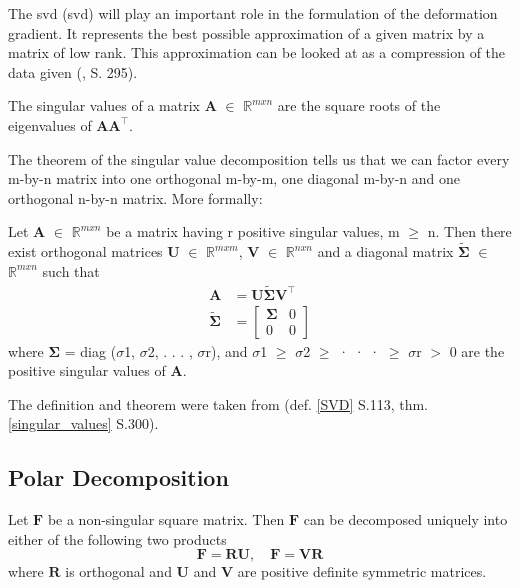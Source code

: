 The \acrlong{svd} (\acrshort{svd}) will play an important role in the formulation of the deformation gradient. It represents the best possible approximation of a given matrix by a matrix of low rank. This approximation can be looked at as a compression of the data given (\cite{LiesenMehrmann2015}, S. 295).

\begin{definition}
\label{singular_values}
The singular values of a matrix $\mathbf{A}$ $\in$ $\mathbb{R}^{m x n}$ are the square roots of the eigenvalues of $\mathbf{AA}^{\intercal}$.
\end{definition}

The theorem of the singular value decomposition tells us that we can factor every m-by-n matrix into one orthogonal m-by-m, one diagonal m-by-n and one orthogonal n-by-n matrix. More formally:

\begin{theorem}
\label{SVD}
Let $\mathbf{A}$ $\in$ $\mathbb{R}^{m x n}$ be a matrix having r positive singular values, m $\geq$ n. Then there exist orthogonal matrices $\mathbf{U}$ $\in$ $\mathbb{R}^{m x m}$, $\mathbf{V}$ $\in$ $\mathbb{R}^{n x n}$ and a diagonal matrix $\mathbf{\tilde{\Sigma}}$ $\in$ $\mathbb{R}^{m x n}$ such that
\begin{align*}
\mathbf{A} &= \mathbf{U \tilde{\Sigma} V^\intercal} \\
\mathbf{\tilde{\Sigma}} &= \left[ \begin{array}{cc} \mathbf{\Sigma} & 0 \\ 0 & 0 \end{array} \right]
\end{align*}
where $\mathbf{\Sigma}$ = diag ($\sigma$1, $\sigma$2, . . . , $\sigma$r), and $\sigma$1 $\geq$ $\sigma$2 $\geq$ · · · $\geq$ $\sigma$r $>$ 0 are the positive singular values of $\mathbf{A}$.

\end{theorem}
The definition and theorem were taken from \cite{ford2014numerical} (def. \ref{SVD} S.113, thm. \ref{singular_values} S.300).




\subsection{Polar Decomposition}

\begin{theorem}
\label{PD}

Let $\mathbf{F}$ be a non-singular square matrix. Then $\mathbf{F}$ can be decomposed uniquely into either of the following two products
\[
\mathbf{F} = \mathbf{RU}, \quad \mathbf{F} = \mathbf{VR}
\]
where $\mathbf{R}$ is orthogonal and $\mathbf{U}$ and $\mathbf{V}$ are positive definite symmetric matrices.
\end{theorem}

